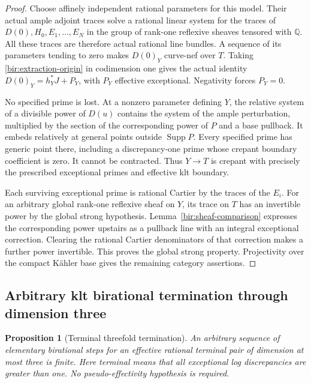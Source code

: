 \documentclass[11pt,letterpaper]{article}
\newtheorem{proposition}[theorem]{Proposition}
\theoremstyle{definition}
\theoremstyle{remark}
\begin{document}
\begin{proof}
Choose affinely independent rational parameters for this model.
Their actual ample adjoint traces solve a rational linear system for
the traces of $D(0),H_0,E_1,\ldots,E_N$ in the group of rank-one
reflexive sheaves tensored with $\mathbb{Q}$.  All these traces are therefore
actual rational line bundles.  A sequence of its parameters tending
to zero makes $D(0)_Y$ curve-nef over $T$.  Taking
\eqref{bir:extraction-origin} in codimension one gives the actual
identity $D(0)_Y=h_Y^*J+P_Y$, with $P_Y$ effective exceptional.
Negativity forces $P_Y=0$.

No specified prime is lost.  At a nonzero parameter defining $Y$,
the relative system of a divisible power of $D(u)$ contains the
system of the ample perturbation, multiplied by the section of the
corresponding power of $P$ and a base pullback.  It embeds relatively
at general points outside $\operatorname{Supp} P$.  Every specified prime has
generic point there, including a discrepancy-one prime whose
crepant boundary coefficient is zero.  It cannot be contracted.
Thus $Y\to T$ is crepant with precisely the prescribed exceptional
primes and effective klt boundary.

Each surviving exceptional prime is rational Cartier by the traces
of the $E_i$.  For an arbitrary global rank-one reflexive sheaf on
$Y$, its trace on $T$ has an invertible power by the global strong
hypothesis.  Lemma~\ref{bir:sheaf-comparison} expresses the
corresponding power upstairs as a pullback line with an integral
exceptional correction.  Clearing the rational Cartier denominators
of that correction makes a further power invertible.  This proves
the global strong property.  Projectivity over the compact K\"ahler
base gives the remaining category assertions.
\end{proof}

\subsection{Arbitrary klt birational termination through dimension three}
\label{bir:threefolds}

\begin{proposition}[Terminal threefold termination]
\label{bir:terminal-termination}
An arbitrary sequence of elementary birational steps for an effective
rational terminal pair of dimension at most three is finite.  Here
terminal means that all exceptional log discrepancies are greater
than one.  No pseudo-effectivity hypothesis is required.
\end{proposition}
\end{document}
